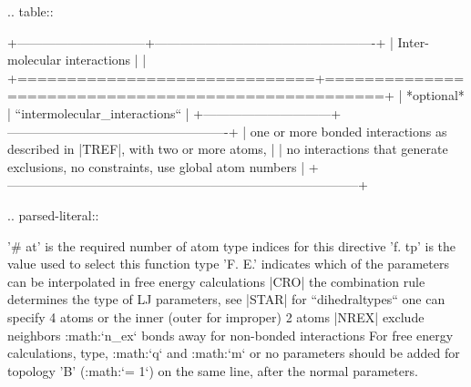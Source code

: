 .. table::

        +------------------------------+----------------------------------------------------+
        | Inter-molecular interactions |                                                    |
        +==============================+====================================================+
        | *optional*                   | ``intermolecular_interactions``                    |
        +------------------------------+----------------------------------------------------+
        | one or more bonded interactions as described in |TREF|, with two or more atoms,   |
        | no interactions that generate exclusions, no constraints, use global atom numbers |
        +-----------------------------------------------------------------------------------+

.. parsed-literal::

    '\# at' is the required number of atom type indices for this directive
    'f. tp' is the value used to select this function type
    'F. E.' indicates which of the parameters can be interpolated in free energy calculations
    |CRO| the combination rule determines the type of LJ parameters, see 
    |STAR| for ``dihedraltypes`` one can specify 4 atoms or the inner (outer for improper) 2 atoms
    |NREX| exclude neighbors :math:`n_{ex}` bonds away for non-bonded interactions
    For free energy calculations, type, :math:`q` and :math:`m`  or no parameters should be added
    for topology 'B' (:math:`\lambda = 1`) on the same line, after the normal parameters.

